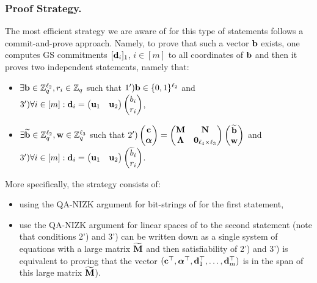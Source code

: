\subsubsection{Proof Strategy.} The most efficient strategy we are aware of for this type of statements follows a 
 commit-and-prove approach. Namely, to prove that such a vector $\mathbf{b}$ exists, one computes 
GS commitments $[\mathbf{d}_i]_1$, $i \in [m]$ to all coordinates of $\mathbf{b}$ and then it proves two independent statements, namely that:
\vspace{-0.2cm}
\begin{itemize}
\item $\exists \mathbf{b}\in \mathbb{Z}_q^{\ell_2}, r_i \in \mathbb{Z}_q$ such that  
$1') \mathbf{b}\in \{0,1\}^{\ell_2}$ and $3') \forall i \in [m]: \mathbf{d}_i=\begin{pmatrix} \mathbf{u}_1 &   \mathbf{u}_2 \end{pmatrix}   \begin{pmatrix}
b_i  \\ r_i  
\end{pmatrix}$,
\item   $\exists \widetilde{\mathbf{b}} \in \mathbb{Z}_q^{\ell_2}, \mathbf{w} \in\mathbb{Z}_q^{\ell_3}$ such that  
   $2') \left(\begin{matrix}
    \mathbf{c}\\
    {\boldsymbol \alpha}
\end{matrix}\right)
=
\begin{pmatrix}
    \mathbf{{M}}       & \mathbf{{N}}\\
    \mathbf{{\Lambda}} & \mathbf{{0}}_{{\ell_4}\times {\ell_3}}
\end{pmatrix}
\left(\begin{matrix}
    \widetilde{\mathbf{b}}\\
    \mathbf{w}
\end{matrix}\right)$ and $3') \forall i \in [m]: \mathbf{d}_i=\begin{pmatrix} \mathbf{u}_1 &   \mathbf{u}_2 \end{pmatrix}   \begin{pmatrix}
\widetilde{b}_i  \\ r_i  
\end{pmatrix}$.
\end{itemize}
More specifically, the strategy consists of:
\begin{itemize}
\item using the QA-NIZK argument for bit-strings of \cite{AC:GonHevRaf15} for the first statement,
\item use the QA-NIZK argument for linear spaces of \cite{C:JutRoy14,EC:KilWee15} to the second statement 
(note that conditions 2') and 3') can be written down as a single system of equations with a large matrix $\widetilde{\mathbf{{M}}}$ and then satisfiability of 
2') and 3') is equivalent to proving that the vector $(\mathbf{c}^{\top},{\boldsymbol \alpha}^{\top},\mathbf{d}_1^{\top}, \ldots, \mathbf{d}_m^{\top})$ is in the span 
of this large matrix $\widetilde{\mathbf{{M}}}$). 
\end{itemize}
